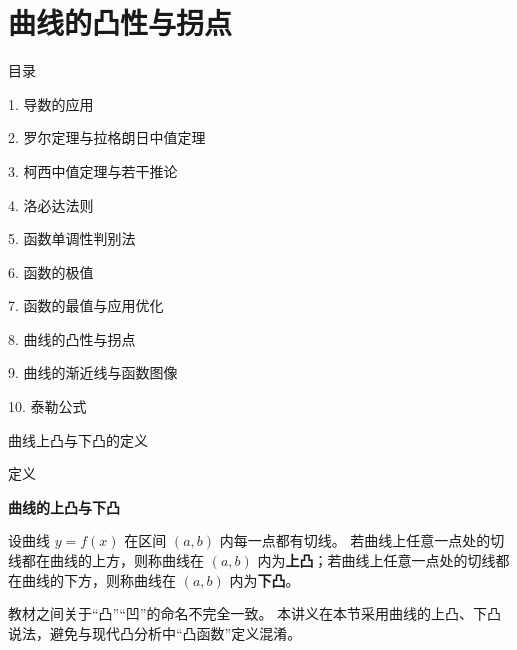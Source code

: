 \documentclass[aspectratio=169,10pt,fontset=fandol]{ctexbeamer}
\begin{document}
\section{曲线的凸性与拐点}
\begin{frame}[t,fragile]{目录}
\normalsize
{\color{black}\normalsize 1. 导数的应用\par}\vspace{0.22em}
{\color{black}\normalsize 2. 罗尔定理与拉格朗日中值定理\par}\vspace{0.22em}
{\color{black}\normalsize 3. 柯西中值定理与若干推论\par}\vspace{0.22em}
{\color{black}\normalsize 4. 洛必达法则\par}\vspace{0.22em}
{\color{black}\normalsize 5. 函数单调性判别法\par}\vspace{0.22em}
{\color{black}\normalsize 6. 函数的极值\par}\vspace{0.22em}
{\color{black}\normalsize 7. 函数的最值与应用优化\par}\vspace{0.22em}
{\color{blue}\normalsize 8. 曲线的凸性与拐点\par}\vspace{0.22em}
{\color{gray!40}\normalsize 9. 曲线的渐近线与函数图像\par}\vspace{0.22em}
{\color{gray!40}\normalsize 10. 泰勒公式\par}\vspace{0.22em}
\end{frame}
\begin{frame}[t,fragile]{曲线上凸与下凸的定义}
\normalsize
\begin{block}{定义}
{\normalsize
\textbf{曲线的上凸与下凸}\par

设曲线 $y=f(x)$ 在区间 $(a,b)$ 内每一点都有切线。 若曲线上任意一点处的切线都在曲线的上方，则称曲线在 $(a,b)$ 内为\textbf{上凸}；若曲线上任意一点处的切线都在曲线的下方，则称曲线在 $(a,b)$ 内为\textbf{下凸}。

教材之间关于“凸”“凹”的命名不完全一致。 本讲义在本节采用曲线的上凸、下凸说法，避免与现代凸分析中“凸函数”定义混淆。

}
\end{block}
\end{frame}
\end{document}
